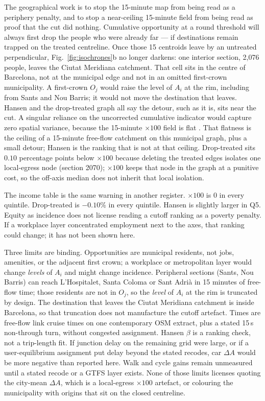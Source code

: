\documentclass[a4paper,fleqn]{cas-dc}
\begin{document}
The geographical work is to stop the 15-minute map from being read as a
periphery penalty, and to stop a near-ceiling 15-minute field from being
read as proof that the cut did nothing. Cumulative opportunity at a round
threshold will always first drop the people who were already far --- if
destinations remain trapped on the treated centreline. Once those 15
centroids leave by an untreated perpendicular, Fig.~\ref{fig:isochrones}b no
longer darkens: one interior section, 2{,}076 people, leaves the Ciutat
Meridiana catchment. That cell sits in the centre of Barcelona, not at the
municipal edge and not in an omitted first-crown municipality. A first-crown
$O_j$ would raise the level of $A_i$ at the rim, including from Sants and
Nou Barris; it would not move the destination that leaves. Hansen and the
drop-treated graph all say the detour, such as it is, sits near the cut. A
singular reliance on the uncorrected cumulative indicator would capture zero
spatial variance, because the 15-minute $\times 100$ field is flat
\citep{Moreno2021,Pozoukidou2021,Handy2020}. That flatness is the ceiling of
a 15-minute free-flow catchment on this municipal graph, plus a small
detour; Hansen is the ranking that is not at that ceiling. Drop-treated sits $0.10$
percentage points below $\times 100$ because deleting the treated edges
isolates one local-egress node (section 2070); $\times 100$ keeps that
node in the graph at a punitive cost, so the off-axis median does not
inherit that local isolation.

The income table is the same warning in another register. $\times 100$ is
$0$ in every quintile. Drop-treated is $-0.10\%$ in every quintile. Hansen
is slightly larger in Q5. Equity as
incidence \citep{Pereira2017,Lucas2012,Martens2017} does not license reading
a cutoff ranking as a poverty penalty. If a workplace layer concentrated
employment next to the axes, that ranking could change; it has not been
shown here.

Three limits are binding. Opportunities are municipal residents, not jobs,
amenities, or the adjacent first crown; a workplace or metropolitan layer
would change \emph{levels} of $A_i$ and might change incidence. Peripheral
sections (Sants, Nou Barris) can reach L'Hospitalet, Santa Coloma or Sant
Adri\`a in 15 minutes of free-flow time; those residents are not in $O_j$,
so the \emph{level} of $A_i$ at the rim is truncated by design. The
destination that leaves the Ciutat Meridiana catchment is inside Barcelona,
so that truncation does not manufacture the cutoff artefact. Times are
free-flow link cruise times on one contemporary OSM extract, plus a stated
15\,s non-through turn, without congested assignment. Hansen $\beta$ is a
ranking check, not a trip-length fit. If junction delay on the remaining
grid were large, or if a user-equilibrium assignment put delay beyond the
stated recodes, car $\Delta A$ would be more negative than reported here.
Walk and cycle gains remain unmeasured until a stated recode or a GTFS
layer exists. None of those limits licenses quoting the city-mean
$\Delta A$, which is a local-egress $\times 100$ artefact, or colouring the
municipality with origins that sit on the closed centreline.
\end{document}
